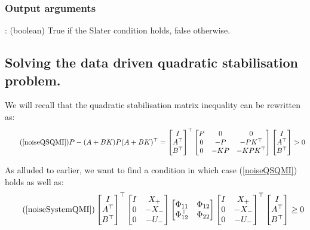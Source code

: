 \subsubsection*{Output arguments}
\textbf{}: (boolean) True if the Slater condition holds, false otherwise.


\subsection{Solving the data driven quadratic stabilisation problem.}
We will recall that the quadratic stabilisation matrix inequality can be rewritten as:
\begin{equation} \tag{\ref{noiseQSQMI}}
P - (A + BK) P (A + BK)^\top = 
\begin{bmatrix} I\\A^\top\\B^\top \end{bmatrix}^\top 
\begin{bmatrix} P&0&0\\0&-P&-PK^\top\\0&-KP&-KPK^\top \end{bmatrix} 
\begin{bmatrix} I\\A^\top\\B^\top \end{bmatrix} > 0
\end{equation}

As alluded to earlier, we want to find a condition in which case (\ref{noiseQSQMI}) holds as well as:
\begin{equation} \tag{\ref{noiseSystemQMI}}
\begin{bmatrix} I \\ A^\top \\ B^\top \end{bmatrix}^\top
\begin{bmatrix} I&X_+ \\ 0 & -X_- \\ 0&-U_- \end{bmatrix}
\begin{bmatrix} \Phi_{11} & \Phi_{12} \\ \Phi_{12}^\top & \Phi_{22} \end{bmatrix}
\begin{bmatrix} I&X_+ \\ 0 & -X_- \\ 0&-U_- \end{bmatrix}^\top
\begin{bmatrix} I \\ A^\top \\ B^\top \end{bmatrix} \geq 0
\end{equation}

